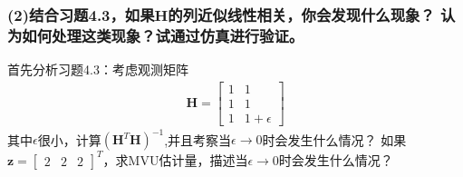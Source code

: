\documentclass[fontset=windows]{article}
\numberwithin{figure}{section}
\begin{document}
\subsubsection*{(2)结合习题4.3，如果\(\mathbf{H}\)的列近似线性相关，你会发现什么现象？
	认为如何处理这类现象？试通过仿真进行验证。}
首先分析习题4.3：考虑观测矩阵
\begin{align*}
	\mathbf{H}=
	\begin{bmatrix}
		1 & 1          \\
		1 & 1          \\
		1 & 1+\epsilon
	\end{bmatrix}
\end{align*}
其中\(\epsilon\)很小，计算\((\mathbf{H}^T\mathbf{H})^{-1}\),并且考察当\(\epsilon \to 0\)时会发生什么情况？
如果\(\mathbf{z}=\begin{bmatrix}2&2&2\end{bmatrix}^T\)，求MVU估计量，描述当\(\epsilon \to 0\)时会发生什么情况？
\end{document}
